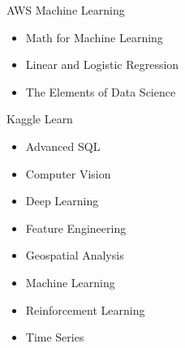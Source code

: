 \vspace*{0.05 in}

\Development
{AWS Machine Learning}
{\begin{itemize}
    \item Math for Machine Learning
    \item Linear and Logistic Regression
    \item The Elements of Data Science
\end{itemize}}

\vspace*{0.05 in}

\Development
{Kaggle Learn}
{\begin{itemize}
    \item Advanced SQL
    \item Computer Vision
    \item Deep Learning
    \item Feature Engineering
    \item Geospatial Analysis
    \item Machine Learning
    \item Reinforcement Learning
    \item Time Series
\end{itemize}}



